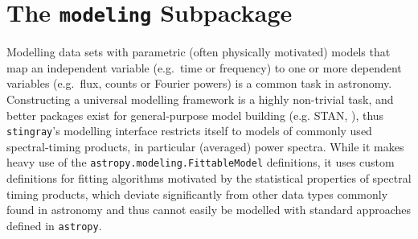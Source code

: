 \documentclass[twocolumn]{aastex62}
\newcommand{\stingray}{\texttt{stingray}\xspace}
\begin{document}








 


\section{The \texttt{modeling} Subpackage}
\label{sec:modeling}

Modelling data sets with parametric (often physically motivated) models that map an independent variable (e.g.\ time or frequency) to one or more dependent variables (e.g.\ flux, counts or Fourier powers) is a common task in astronomy. Constructing a universal modelling framework is a highly non-trivial task, and better packages exist for general-purpose model building (e.g. STAN, \citealt{stan}), thus \stingray's modelling interface restricts itself to models of commonly used spectral-timing products, in particular (averaged) power spectra. 
While it makes heavy use of the \verb|astropy.modeling.FittableModel| definitions, it uses custom definitions for fitting algorithms motivated by the statistical properties of spectral timing products, which deviate significantly from other data types commonly found in astronomy and thus cannot easily be modelled with standard approaches defined in \texttt{astropy}.
\end{document}
